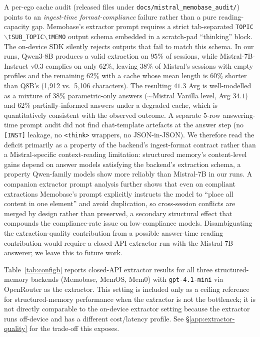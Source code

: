 A per-ego cache audit (released files under \texttt{docs/mistral\_memobase\_audit/}) points to an \emph{ingest-time format-compliance} failure rather than a pure reading-capacity gap. Memobase's extractor prompt requires a strict tab-separated \texttt{TOPIC}$\backslash$\texttt{t}\texttt{SUB\_TOPIC}$\backslash$\texttt{t}\texttt{MEMO} output schema embedded in a scratch-pad ``thinking'' block. The on-device SDK silently rejects outputs that fail to match this schema. In our runs, Qwen3-8B produces a valid extraction on $95\%$ of sessions, while Mistral-7B-Instruct v0.3 complies on only $62\%$, leaving $38\%$ of Mistral's sessions with empty profiles and the remaining $62\%$ with a cache whose mean length is $60\%$ shorter than Q8B's (1{,}912 vs.\ 5{,}106 characters). The resulting $41.3$ Avg is well-modelled as a mixture of $38\%$ parametric-only answers ($\sim\!$Mistral Vanilla level, Avg $34.1$) and $62\%$ partially-informed answers under a degraded cache, which is quantitatively consistent with the observed outcome. A separate 5-row answering-time prompt audit did not find chat-template artefacts at the answer step (no \texttt{[INST]} leakage, no \texttt{<think>} wrappers, no JSON-in-JSON). We therefore read the deficit primarily as a property of the backend's ingest-format contract rather than a Mistral-specific context-reading limitation: structured memory's content-level gains depend on answer models satisfying the backend's extraction schema, a property Qwen-family models show more reliably than Mistral-7B in our runs. A companion extractor prompt analysis further shows that even on compliant extractions Memobase's prompt explicitly instructs the model to ``place all content in one element'' and avoid duplication, so cross-session conflicts are merged by design rather than preserved, a secondary structural effect that compounds the compliance-rate issue on low-compliance models. Disambiguating the extraction-quality contribution from a possible answer-time reading contribution would require a closed-API extractor run with the Mistral-7B answerer; we leave this to future work.

Table~\ref{tab:configb} reports closed-API extractor results for all three structured-memory backends (Memobase, MemOS, Mem0) with \texttt{gpt-4.1-mini} via OpenRouter as the extractor. This setting is included only as a ceiling reference for structured-memory performance when the extractor is not the bottleneck; it is not directly comparable to the on-device extractor setting because the extractor runs off-device and has a different cost/latency profile. See \S\ref{app:extractor-quality} for the trade-off this exposes.

